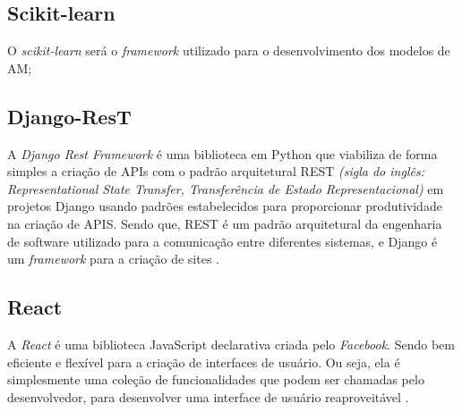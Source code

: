 \subsection{Scikit-learn}
O \textit{scikit-learn} será o \textit{framework} utilizado para o desenvolvimento dos modelos de AM;
\subsection{Django-ResT}

A \textit{Django Rest Framework} é uma biblioteca em Python que viabiliza de forma simples a criação de APIs com o padrão arquitetural REST \textit{(sigla do inglês: Representational State Transfer, Transferência de Estado Representacional)} em projetos Django usando padrões estabelecidos para proporcionar produtividade na criação de APIS. Sendo que, REST é um padrão arquitetural da engenharia de software utilizado para a comunicação entre diferentes sistemas, e Django é um \textit{framework} para a criação de sites \cite{christie2011django}.

\subsection{React}

A \textit{React} é uma biblioteca JavaScript declarativa criada pelo \textit{Facebook}. Sendo bem eficiente e flexível para a criação de interfaces de usuário. Ou seja, ela é simplesmente uma coleção de funcionalidades que podem ser chamadas pelo desenvolvedor, para desenvolver uma interface de usuário reaproveitável \cite{reactjs}.
